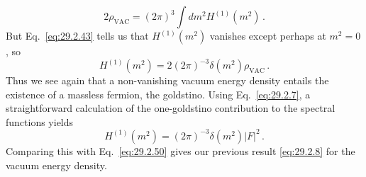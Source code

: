 \begin{equation}
  2\rho_{\mathrm{VAC}}
  =(2\pi)^3\int dm^2H^{(1)}(m^2)\,.
  \tag{29.2.49}\label{eq:29.2.49}
\end{equation}
But Eq.~\eqref{eq:29.2.43} tells us that \(H^{(1)}(m^2)\) vanishes
except perhaps at \(m^2=0\), so
\begin{equation}
  H^{(1)}(m^2)
  =2(2\pi)^{-3}\delta(m^2)\rho_{\mathrm{VAC}}\,.
  \tag{29.2.50}\label{eq:29.2.50}
\end{equation}
Thus we see again that a non-vanishing vacuum energy density entails the
existence of a massless fermion, the goldstino. Using Eq.~\eqref{eq:29.2.7},
a straightforward calculation of the one-goldstino contribution to the
spectral functions yields
\begin{equation}
  H^{(1)}(m^2)
  =(2\pi)^{-3}\delta(m^2)\lvert F\rvert^2\,.
  \tag{29.2.51}\label{eq:29.2.51}
\end{equation}
Comparing this with Eq.~\eqref{eq:29.2.50} gives our previous result
\eqref{eq:29.2.8} for the vacuum energy density.
